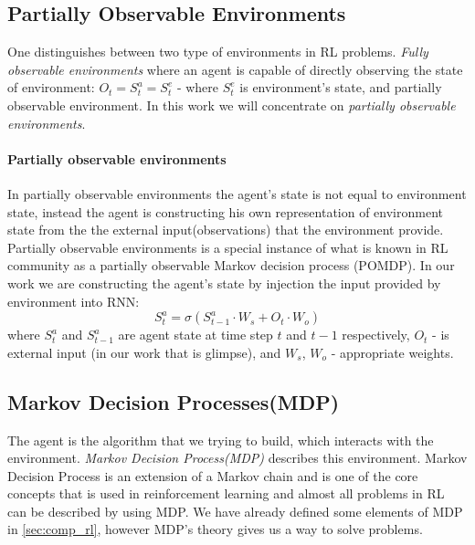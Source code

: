 \subsection{Partially Observable Environments}
One distinguishes between two type of environments in RL problems.
\emph{Fully observable environments} where an agent is capable of directly
observing the state of environment:
$O_t = S_t^a = S_t^e$ - where $S_t^e$ is environment's state,
and partially observable environment. In this work we will concentrate
on \emph{partially observable environments}.

\paragraph{Partially observable environments}
In partially observable environments the agent's state is not equal to environment state,
instead the agent is constructing his own representation of environment state from
the the external input(observations) that the environment provide.
Partially observable environments is a special instance of what is known in RL community
as a partially observable Markov decision process (POMDP). In our work we are constructing
the agent's state by injection the input provided by environment into RNN:
\begin{equation} \label{eq:rnn_state}
	S_t^a = \sigma(S_{t-1}^a \cdot W_s + O_t \cdot W_o)
\end{equation}
where $S_t^a$ and $S_{t-1}^a$ are agent state at time step $t$ and $t-1$
respectively, $O_t$ - is external input (in our work that is glimpse),
and $W_s$, $W_o$ - appropriate weights.



\subsection{Markov Decision Processes(MDP)} \label{subs:reward_process}
The agent is the algorithm that we trying to build, which interacts with
the environment. \emph{Markov Decision Process(MDP)} describes this environment.
Markov Decision Process is an extension of a Markov chain and is one of the core
concepts that is used in reinforcement learning and almost all problems in RL
can be described by using MDP. We have already defined some elements of MDP in \autoref{sec:comp_rl},
however MDP's theory gives us a way to solve problems.

